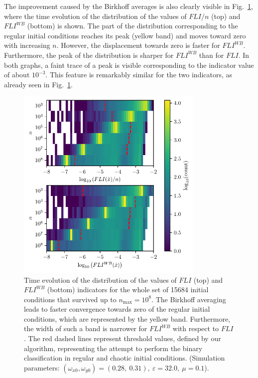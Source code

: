 The improvement caused by the Birkhoff averages is also clearly visible in Fig.~\ref{fig:fli_colormap_mean_birk}, where the time evolution of the distribution of the values of $FLI/n$ (top) and $FLI^{WB}$ (bottom) is shown. The part of the distribution corresponding to the regular initial conditions reaches its peak (yellow band) and moves toward zero with increasing $n$. However, the displacement towards zero is faster for $FLI^{WB}$. Furthermore, the peak of the distribution is sharper for $FLI^{WB}$ than for $FLI$. In both graphs, a faint trace of a peak is visible corresponding to the indicator value of about $10^{-3}$. This feature is remarkably similar for the two indicators, as already seen in Fig.~\ref{fig:fli_colormap_mean_birk}.

\begin{figure}[htp]
    \centering
    \includegraphics[width=0.8\textwidth]{6_dynamic_indicators/fig/lyapunov_birkhoff_map.pdf}
    \caption{Time evolution of the distribution of the values of $FLI$ (top) and $FLI^{WB}$ (bottom) indicators for the whole set of 15684 initial conditions that survived up to $n_\text{max}=10^8$. The Birkhoff averaging leads to faster convergence towards zero of the regular initial conditions, which are represented by the yellow band. Furthermore, the width of such a band is narrower for $FLI^{WB}$ with respect to $FLI$. The red dashed lines represent threshold values, defined by our algorithm, representing the attempt to perform the binary classification in regular and chaotic initial conditions. (Simulation parameters: $(\omega_{x0},\omega_{y0})= (0.28,\ 0.31),\ \varepsilon=32.0,\  \mu=0.1$).}
    \label{fig:fli_colormap_mean_birk}
\end{figure}

